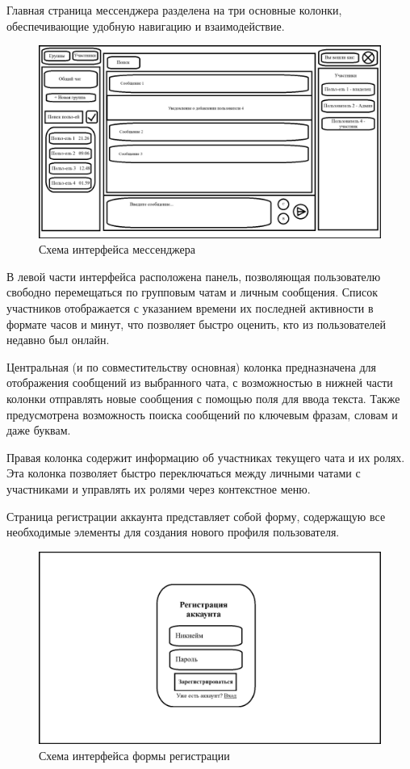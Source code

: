 Главная страница мессенджера разделена на три основные колонки, обеспечивающие удобную навигацию и взаимодействие.

\begin{figure}[ht]
	\centering
	\includegraphics[width=0.8\linewidth]{"images/UI макет"}
	\caption{Схема интерфейса мессенджера}
	\label{fig:ui-main}
\end{figure}

В левой части интерфейса расположена панель, позволяющая пользователю свободно перемещаться по групповым чатам и личным сообщения. Список участников отображается с указанием времени их последней активности в формате часов и минут, что позволяет быстро оценить, кто из пользователей недавно был онлайн.

Центральная (и по совместительству основная) колонка предназначена для отображения сообщений из выбранного чата, с возможностью в нижней части колонки отправлять новые сообщения с помощью поля для ввода текста. Также предусмотрена возможность поиска сообщений по ключевым фразам, словам и даже буквам.

Правая колонка содержит информацию об участниках текущего чата и их ролях. Эта колонка позволяет быстро переключаться между личными чатами с участниками и управлять их ролями через контекстное меню.

Страница регистрации аккаунта представляет собой форму, содержащую все необходимые элементы для создания нового профиля пользователя. 

\begin{figure}[ht]
	\centering
	\includegraphics[width=0.8\linewidth]{"images/UI макет регистрации"}
	\caption{Схема интерфейса формы регистрации}
	\label{fig:ui-reg}
\end{figure}

